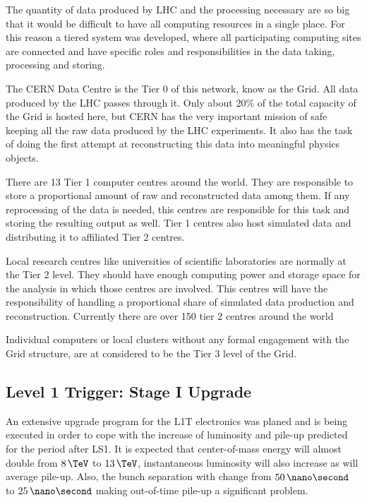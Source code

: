 The quantity of data produced by \gls{LHC} and the processing necessary are so big that it would be difficult to have all computing resources in a single place. For this reason a tiered system was developed, where all participating computing sites are connected and have specific roles and responsibilities in the data taking, processing and storing.

The \gls{CERN} Data Centre is the Tier 0 of this network, know as the Grid. All data produced by the \gls{LHC} passes through it. Only about 20\% of the total capacity of the Grid is hosted here, but \gls{CERN} has the very important mission of safe keeping all the raw data produced by the \gls{LHC} experiments. It also has the task of doing the first attempt at reconstructing this data into meaningful physics objects. 

There are 13 Tier 1 computer centres around the world. They are responsible to store a proportional amount of raw and reconstructed data among them. If any reprocessing of the data is needed, this centres are responsible for this task and storing the resulting output as well. Tier 1 centres also host simulated data and distributing it  to affiliated Tier 2 centres. 

Local research centres like universities of scientific laboratories are normally at the Tier 2 level. They should have enough computing power and storage space for the analysis in which those centres are involved. This centres will have the responsibility of handling a proportional share of simulated data production and reconstruction. Currently there are over 150 tier 2 centres around the world

Individual computers or local clusters without any formal engagement with the Grid structure, are at considered to be the Tier 3 level of the Grid. 

\subsection{Level 1 Trigger: Stage I Upgrade}
\label{SUBSECTION:ExperimentalApparatus_CMS_L1TStage1}


An extensive upgrade program for the \gls{L1T} electronics was planed and is being executed in order to cope with the increase of luminosity and pile-up predicted for the period after \gls{LS1}\cite{CMSTDR:CMSL1Upgrade}. It is expected that center-of-mass energy will almost double from $8\,\TeV$ to $13\,\TeV$, instantaneous luminosity will also increase as will average pile-up. Also, the bunch separation with change from $50\,\nano\second$ to $25\,\nano\second$ making out-of-time pile-up a significant problem. 

